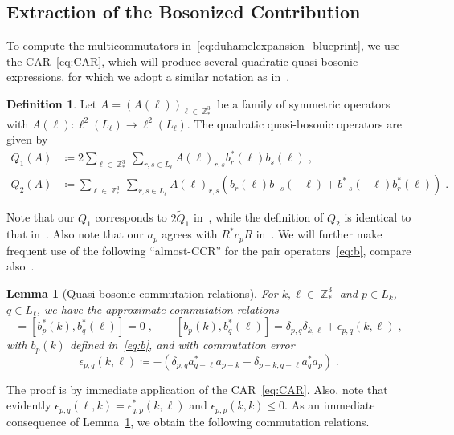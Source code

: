 \documentclass[12pt,a4paper]{article}
\numberwithin{equation}{section}
\newcommand{\1}{\mathbb{I}}
\DeclareMathOperator{\Z}{\mathbb{Z}}
\theoremstyle{plain}
\newtheorem{lemma}[theorem]{Lemma}
\theoremstyle{definition}
\newtheorem{definition}[theorem]{Definition}
\theoremstyle{remark}
\theoremstyle{plain}
\theoremstyle{definition}
\theoremstyle{remark}
\begin{document}
\subsection{Extraction of the Bosonized Contribution}
\label{sec:extraction_bos}

To compute the multicommutators in~\eqref{eq:duhamelexpansion_blueprint}, we use the CAR~\eqref{eq:CAR}, which will produce several quadratic quasi-bosonic expressions, for which we adopt a similar notation as in~\cite{CHN21}.

\begin{definition} \label{def:Q}
Let $A=(A(\ell))_{\ell \in \Z^3_*} $ be a family of symmetric operators with $A(\ell): \ell^2(L_\ell)\rightarrow \ell^2(L_\ell)$. The quadratic quasi-bosonic operators are given by
\begin{equation} \label{eq:Q}
\begin{aligned}
	Q_1(A)&\coloneq 2 \sum\limits_{\ell \in \Z^3_*}\sum\limits_{r,s \in L_{\ell}}A(\ell)_{r,s} b^*_r(\ell)b_{s}(\ell) \;,\\ 
	Q_2(A)&\coloneq \sum\limits_{\ell \in \Z^3_*}\sum\limits_{r,s \in L_{\ell}}A(\ell)_{r,s} \left(b_r(\ell)b_{-s}(-\ell)+b^*_{-s}(-\ell)b^*_{r}(\ell)\right) \;.
\end{aligned}
\end{equation} 
\end{definition}
Note that our $ Q_1 $ corresponds to $ 2 \tilde Q_1 $ in~\cite{CHN21}, while the definition of $ Q_2 $ is identical to that in~\cite{CHN21}. Also note that our $ a_p $ agrees with $ R^* c_p R $ in~\cite{CHN21,CHN23,CHN24}. We will further make frequent use of the following ``almost-CCR'' for the pair operators~\eqref{eq:b}, compare also~\cite[(1.66)]{CHN21}.

\begin{lemma}[Quasi-bosonic commutation relations]\label{lem:paircomm}
For $k,\ell \in \Z^3_*$ and $p \in L_{k}$, $q\in L_{\ell}$, we have the approximate commutation relations
\begin{equation}
	[b_{p}(k),b_{q}(\ell)]
	= [b^*_{p}(k),b^*_{q}(\ell)] = 0 \;, \qquad
	[b_{p}(k),b^*_{q}(\ell)]
	= \delta_{p,q}\delta_{k,\ell} + \epsilon_{p,q}(k,\ell) \;,
\end{equation}
with $ b_p(k) $ defined in~\eqref{eq:b}, and with commutation error
\begin{equation}
	\epsilon_{p,q}(k,\ell)
	\coloneq -\left(\delta_{p,q}a^*_{q-\ell}a_{p-k} + \delta_{p-k,q-\ell}a^*_{q}a_{p}\right) \;.
\end{equation}
\end{lemma}
The proof is by immediate application of the CAR~\eqref{eq:CAR}. Also, note that evidently $\epsilon_{p,q}(\ell,k) = \epsilon^*_{q,p}(k,\ell) $ and $\epsilon_{p,p}(k,k)\leq 0$. As an immediate consequence of Lemma~\ref{lem:paircomm}, we obtain the following commutation relations.
\end{document}

